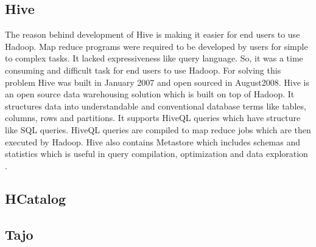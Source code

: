 \subsection{Hive}
     
     The reason behind development of Hive is making it easier for end
     users to use Hadoop. Map reduce programs were required to be
     developed by users for simple to complex tasks. It lacked
     expressiveness like query language. So, it was a time consuming
     and difficult task for end users to use Hadoop. For solving this
     problem Hive was built in January 2007 and open sourced in
     August2008.  Hive is an open source data warehousing solution
     which is built on top of Hadoop. It structures data into
     understandable and conventional database terms like tables,
     columns, rows and partitions. It supports HiveQL queries which
     have structure like SQL queries. HiveQL queries are compiled to
     map reduce jobs which are then executed by Hadoop.  Hive also
     contains Metastore which includes schemas and statistics which is
     useful in query compilation, optimization and data exploration
     \cite{www-hive}.

     \pv

\subsection{HCatalog}

\pv 

\subsection{Tajo}

